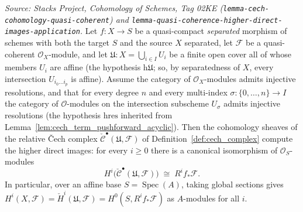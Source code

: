 \begin{lemma}

  \label{lem:cech_computes_cohomology}
  \textit{Source: Stacks Project, Cohomology of Schemes, Tag 02KE
  (\texttt{lemma-cech-cohomology-quasi-coherent}) and
  \texttt{lemma-quasi-coherence-higher-direct-images-application}.}
  Let \(f : X \to S\) be a quasi-compact \emph{separated} morphism of schemes with
  both the target \(S\) and the source \(X\) separated, let \(\mathcal{F}\) be a
  quasi-coherent \(\mathcal{O}_X\)-module, and let
  \(\mathfrak{U} : X = \bigcup_{i \in I} U_i\) be a finite open cover all of whose
  members \(U_i\) are affine (the hypothesis \(\mathrm{h}\mathfrak{U}\); so, by
  separatedness of \(X\), every intersection \(U_{i_0 \ldots i_p}\) is affine).
  Assume the category of \(\mathcal{O}_X\)-modules admits injective resolutions, and
  that for every degree \(n\) and every multi-index \(\sigma : \{0, \ldots, n\} \to I\)
  the category of \(\mathcal{O}\)-modules on the intersection subscheme \(U_\sigma\)
  admits injective resolutions (the hypothesis \(\mathrm{hres}\) inherited from
  Lemma~\ref{lem:cech_term_pushforward_acyclic}). Then the cohomology sheaves of the
  relative {\v C}ech complex \(\check{\mathcal{C}}^\bullet(\mathfrak{U}, \mathcal{F})\)
  of Definition~\ref{def:cech_complex} compute the higher direct images: for every
  \(i \geq 0\) there is a canonical isomorphism of \(\mathcal{O}_S\)-modules
  \[
    H^i\bigl(\check{\mathcal{C}}^\bullet(\mathfrak{U}, \mathcal{F})\bigr)
      \;\cong\; R^i f_*\mathcal{F}.
  \]
  In particular, over an affine base \(S = \operatorname{Spec}(A)\), taking global
  sections gives \(H^i(X, \mathcal{F}) = \check{H}^i(\mathfrak{U}, \mathcal{F}) =
  H^0(S, R^i f_*\mathcal{F})\) as \(A\)-modules for all \(i\).


\end{lemma}
